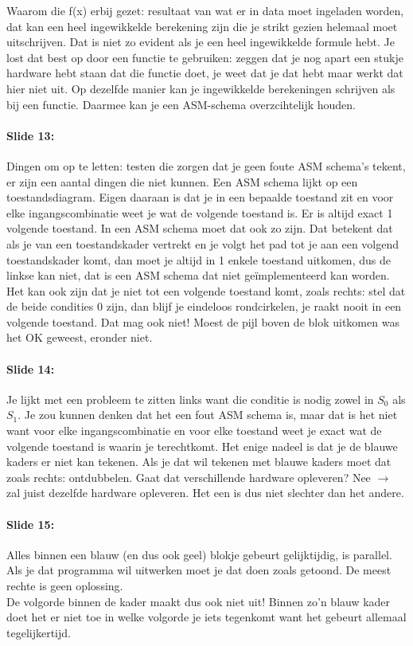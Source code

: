 \documentclass[10pt,a4paper]{book}
\begin{document}
Waarom die f(x) erbij gezet: resultaat van wat er in data moet ingeladen worden, dat kan een heel ingewikkelde berekening zijn die je strikt gezien helemaal moet uitschrijven. Dat is niet zo evident als je een heel ingewikkelde  formule hebt. Je lost dat best op door een functie te gebruiken: zeggen dat je nog apart een stukje hardware hebt staan dat die functie doet, je weet dat je dat hebt maar werkt dat hier niet uit. Op dezelfde manier kan je ingewikkelde berekeningen schrijven als bij een functie. Daarmee kan je een ASM-schema overzcihtelijk houden.

\paragraph{Slide 13:} Dingen om op te letten: testen die zorgen dat je geen foute ASM schema's tekent, er zijn een aantal dingen die niet kunnen. Een ASM schema lijkt op een toestandsdiagram. Eigen daaraan is dat je in een bepaalde toestand zit en voor elke ingangscombinatie weet je wat de volgende toestand is. Er is altijd exact 1 volgende toestand. In een ASM schema moet dat ook zo zijn. Dat betekent dat als je van een toestandskader vertrekt en je volgt het pad tot je aan een volgend toestandskader komt, dan moet je altijd in 1 enkele toestand uitkomen, dus de linkse kan niet, dat is een ASM schema dat niet ge\"implementeerd kan worden. Het kan ook zijn dat je niet tot een volgende toestand komt, zoals rechts: stel dat de beide condities 0 zijn, dan blijf je eindeloos rondcirkelen, je raakt nooit in een volgende toestand. Dat mag ook niet! Moest de pijl boven de blok uitkomen was het OK geweest, eronder niet.

\paragraph{Slide 14:} Je lijkt met een probleem te zitten links want die conditie is nodig zowel in $S_0$ als $S_1$. Je zou kunnen denken dat het een fout ASM schema is, maar dat is het niet want voor elke ingangscombinatie en voor elke toestand weet je exact wat de volgende toestand is waarin je terechtkomt. Het enige nadeel is dat je de blauwe kaders er niet kan tekenen. Als je dat wil tekenen met blauwe kaders moet dat zoals rechts: ontdubbelen. Gaat dat verschillende hardware opleveren? Nee $\rightarrow$ zal juist dezelfde hardware opleveren. Het een is dus niet slechter dan het andere.

\paragraph{Slide 15:} Alles binnen een blauw (en dus ook geel) blokje gebeurt gelijktijdig, is parallel. Als je dat programma wil uitwerken moet je dat doen zoals getoond. De meest rechte is geen oplossing.\\
De volgorde binnen de kader maakt dus ook niet uit! Binnen zo'n blauw kader doet het er niet toe in welke volgorde je iets tegenkomt want het gebeurt allemaal tegelijkertijd.
\end{document}
